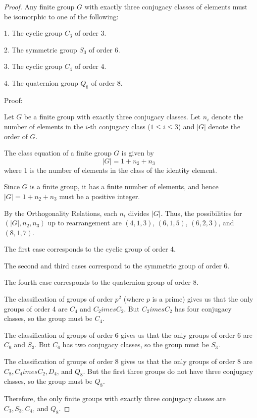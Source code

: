 \documentclass{amsart}
\theoremstyle{plain}
\begin{document}
\begin{proof}Any finite group $G$ with exactly three conjugacy classes of elements must be isomorphic to one of the following:

1. The cyclic group $C_3$ of order 3. 

2. The symmetric group $S_3$ of order 6.

3. The cyclic group $C_4$ of order 4.

4. The quaternion group $Q_8$ of order 8.

Proof:

Let $G$ be a finite group with exactly three conjugacy classes. Let $n_i$ denote the number of elements in the $i$-th conjugacy class ($1 \leq i \leq 3$) and $|G|$ denote the order of $G$. 

The class equation of a finite group $G$ is given by 
$$|G| = 1 + n_2 + n_3$$
where $1$ is the number of elements in the class of the identity element.

Since $G$ is a finite group, it has a finite number of elements, and hence $|G| = 1 + n_2 + n_3$ must be a positive integer.

By the Orthogonality Relations, each $n_i$ divides $|G|$. Thus, the possibilities for $(|G|, n_2, n_3)$ up to rearrangement are $(4, 1, 3)$, $(6, 1, 5)$, $(6, 2, 3)$, and $(8, 1, 7)$.

The first case corresponds to the cyclic group of order 4.

The second and third cases correspond to the symmetric group of order 6.

The fourth case corresponds to the quaternion group of order 8. 

The classification of groups of order $p^2$ (where $p$ is a prime) gives us that the only groups of order 4 are $C_4$ and $C_2	imes C_2$. But $C_2 	imes C_2$ has four conjugacy classes, so the group must be $C_4$. 

The classification of groups of order 6 gives us that the only groups of order 6 are $C_6$ and $S_3$. But $C_6$ has two conjugacy classes, so the group must be $S_3$.

The classification of groups of order 8 gives us that the only groups of order 8 are $C_8, C_4 	imes C_2, D_4$, and $Q_8$. But the first three groups do not have three conjugacy classes, so the group must be $Q_8$.

Therefore, the only finite groups with exactly three conjugacy classes are $C_3, S_3, C_4$, and $Q_8$.
\end{proof}
\end{document}
